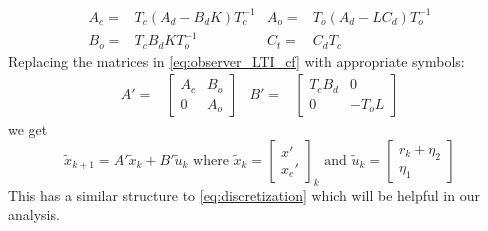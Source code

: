 \documentclass[sigconf]{llncs}
\newcommand{\mat}[1]{{#1}}
\renewcommand{\vec}[1]{{#1}}
\begin{document}
{
\begin{align*}
\mat{A}_{c}=&\mat{T}_c\left(\mat{A}_d-\mat{B}_d\mat{K}\right)\mat{T}_c^{-1}&
\mat{A}_{o}=&\mat{T}_o\left(\mat{A}_d-\mat{L}\mat{C}_d\right)\mat{T}_o^{-1}\\
\mat{B}_{o}=&\mat{T}_c\mat{B}_d\mat{K}\mat{T}_o^{-1}&
\mat{C}_t=&\mat{C}_d\mat{T}_c
\end{align*}
Replacing the matrices in \eqref{eq:observer_LTI_cf} with appropriate symbols:
\begin{align}
\mat{A}'=&\left [\begin{array}{cc}\mat{A}_{c}&\mat{B}_{o}\\ \mat{0}&\mat{A}_{o}\end{array}\right]&
\mat{B}'=&\left[\begin{array}{cc}\mat{T}_c\mat{B}_d&\mat{0}\\\mat{0}&-\mat{T}_o\mat{L}\end{array}\right]
\label{eq:of_dynamics}
\end{align}
}
we get
\begin{displaymath}
\tilde{\vec{x}}_{k+1}=\mat{A}' \tilde{\vec{x}}_{k}+\mat{B}' \tilde{\vec{u}}_k \text{ where }
\tilde{\vec{x}}_k=\left [\begin{array}{c}\vec{x}'\\ \vec{x}_e' \end{array}\right]_k \text{ and }
\tilde{\vec{u}}_k=\left [\begin{array}{c}\vec{r}_k+\vec{\eta}_2\\ \vec{\eta}_1\end{array}\right]
\label{eq:simple_observer_LTI}
\end{displaymath}
This has a similar structure to \eqref{eq:discretization} which will be helpful in our analysis.
\end{document}
